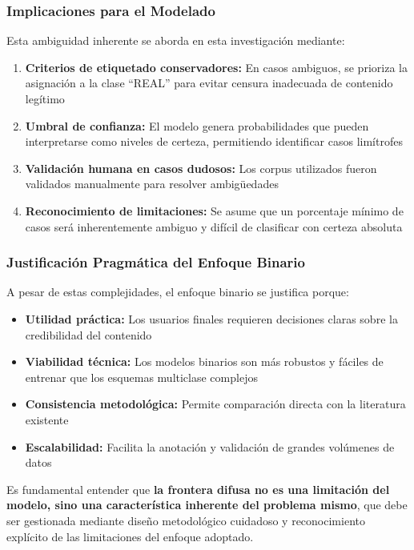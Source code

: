 \subsubsection{Implicaciones para el Modelado}

Esta ambiguidad inherente se aborda en esta investigación mediante:

\begin{enumerate}
    \item \textbf{Criterios de etiquetado conservadores:} En casos ambiguos, se prioriza la asignación a la clase ``REAL'' para evitar censura inadecuada de contenido legítimo
    \item \textbf{Umbral de confianza:} El modelo genera probabilidades que pueden interpretarse como niveles de certeza, permitiendo identificar casos limítrofes
    \item \textbf{Validación humana en casos dudosos:} Los corpus utilizados fueron validados manualmente para resolver ambigüedades
    \item \textbf{Reconocimiento de limitaciones:} Se asume que un porcentaje mínimo de casos será inherentemente ambiguo y difícil de clasificar con certeza absoluta
\end{enumerate}

\subsubsection{Justificación Pragmática del Enfoque Binario}

A pesar de estas complejidades, el enfoque binario se justifica porque:

\begin{itemize}
    \item \textbf{Utilidad práctica:} Los usuarios finales requieren decisiones claras sobre la credibilidad del contenido
    \item \textbf{Viabilidad técnica:} Los modelos binarios son más robustos y fáciles de entrenar que los esquemas multiclase complejos
    \item \textbf{Consistencia metodológica:} Permite comparación directa con la literatura existente
    \item \textbf{Escalabilidad:} Facilita la anotación y validación de grandes volúmenes de datos
\end{itemize}

Es fundamental entender que \textbf{la frontera difusa no es una limitación del modelo, sino una característica inherente del problema mismo}, que debe ser gestionada mediante diseño metodológico cuidadoso y reconocimiento explícito de las limitaciones del enfoque adoptado.

